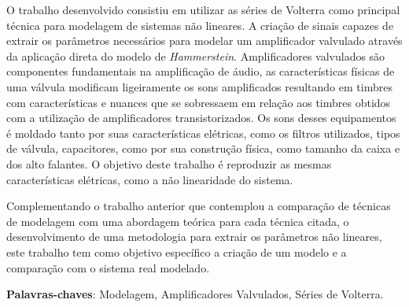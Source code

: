 \begin{resumo}

 O trabalho desenvolvido consistiu em utilizar as séries de Volterra como principal técnica para modelagem de sistemas não lineares. A criação de sinais capazes de extrair os parâmetros necessários para modelar um amplificador valvulado através da aplicação direta do modelo de \textit{Hammerstein}. Amplificadores valvulados são componentes fundamentais na amplificação de áudio, as características físicas de uma válvula modificam ligeiramente os sons amplificados resultando em timbres com características e nuances que se sobressaem em relação aos timbres obtidos com a utilização de amplificadores transistorizados. Os sons desses equipamentos é moldado tanto por suas características elétricas, como os filtros utilizados, tipos de válvula, capacitores, como por sua construção física, como tamanho da caixa e dos alto falantes. O objetivo deste trabalho é reproduzir as mesmas características elétricas, como a não linearidade do sistema.
 
 Complementando o trabalho anterior que contemplou a comparação de técnicas de modelagem com uma abordagem teórica para cada técnica citada, o desenvolvimento de uma metodologia para extrair os parâmetros não lineares, este trabalho tem como objetivo específico a criação de um modelo e a comparação com o sistema real modelado.

 \vspace{\onelineskip}
    
 \noindent
 \textbf{Palavras-chaves}: Modelagem, Amplificadores Valvulados, Séries de Volterra.
\end{resumo}
